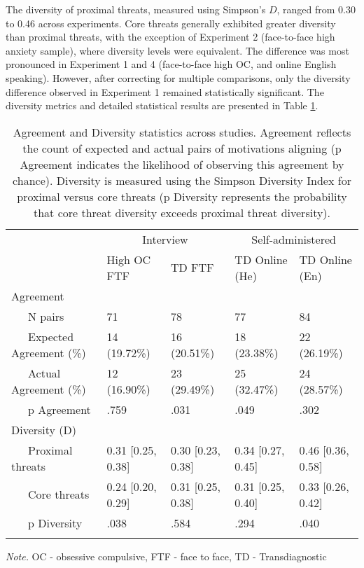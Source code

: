 \documentclass[
  man,floatsintext]{apa7}
\begin{document}
The diversity of proximal threats, measured using Simpson's \(D\), ranged from 0.30 to 0.46 across experiments.
Core threats generally exhibited greater diversity than proximal threats, with the exception of Experiment 2 (face-to-face high anxiety sample), where diversity levels were equivalent.
The difference was most pronounced in Experiment 1 and 4 (face-to-face high OC, and online English speaking).
However, after correcting for multiple comparisons, only the diversity difference observed in Experiment 1 remained statistically significant.
The diversity metrics and detailed statistical results are presented in Table \ref{tab:agreement}.

\begin{table}[tbp]

\begin{center}
\begin{threeparttable}

\caption{\label{tab:agreement}Agreement and Diversity statistics across studies. Agreement reflects the count of expected and actual pairs of motivations aligning (p Agreement indicates the likelihood of observing this agreement by chance). Diversity is measured using the Simpson Diversity Index for proximal versus core threats (p Diversity represents the probability that core threat diversity exceeds proximal threat diversity).}

\begin{tabular}{lllll}
\toprule
 & \multicolumn{2}{c}{Interview} & \multicolumn{2}{c}{Self-administered} \\
\cmidrule(r){2-3} \cmidrule(r){4-5}
 & High OC FTF & TD FTF & TD Online (He) & TD Online (En)\\
\midrule
Agreement &  &  &  & \\
\ \ \ N pairs & 71 & 78 & 77 & 84\\
\ \ \ Expected Agreement (\%) & 14 (19.72\%) & 16 (20.51\%) & 18 (23.38\%) & 22 (26.19\%)\\
\ \ \ Actual Agreement (\%) & 12 (16.90\%) & 23 (29.49\%) & 25 (32.47\%) & 24 (28.57\%)\\
\ \ \ p Agreement & .759 & .031 & .049 & .302\\
Diversity (D) &  &  &  & \\
\ \ \ Proximal threats & 0.31 [0.25, 0.38] & 0.30 [0.23, 0.38] & 0.34 [0.27, 0.45] & 0.46 [0.36, 0.58]\\
\ \ \ Core threats & 0.24 [0.20, 0.29] & 0.31 [0.25, 0.38] & 0.31 [0.25, 0.40] & 0.33 [0.26, 0.42]\\
\ \ \ p Diversity & .038 & .584 & .294 & .040\\
\bottomrule
\addlinespace
\end{tabular}

\begin{tablenotes}[para]
\normalsize{\textit{Note.} OC - obsessive compulsive, FTF - face to face, TD - Transdiagnostic}
\end{tablenotes}

\end{threeparttable}
\end{center}

\end{table}
\end{document}
